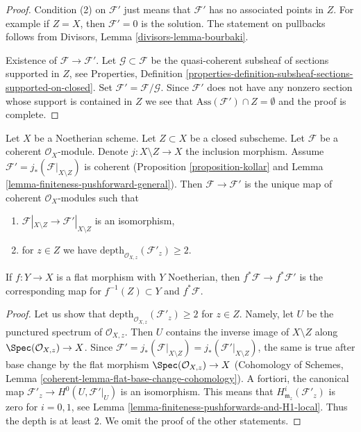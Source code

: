 \begin{proof}
Condition (2) on $\mathcal{F}'$ just means that $\mathcal{F}'$
has no associated points in $Z$. For example if
$Z = X$, then $\mathcal{F}' = 0$ is the solution.
The statement on pullbacks follows from
Divisors, Lemma \ref{divisors-lemma-bourbaki}.

\medskip\noindent
Existence of $\mathcal{F} \to \mathcal{F}'$.
Let $\mathcal{G} \subset \mathcal{F}$
be the quasi-coherent subsheaf of sections supported in $Z$, see
Properties, Definition
\ref{properties-definition-subsheaf-sections-supported-on-closed}.
Set $\mathcal{F}' = \mathcal{F}/\mathcal{G}$.
Since $\mathcal{F}'$ does not have any nonzero section
whose support is contained in $Z$ we see that
$\text{Ass}(\mathcal{F}') \cap Z = \emptyset$
and the proof is complete.
\end{proof}

\begin{lemma}
\label{lemma-get-depth-2-along-Z}
Let $X$ be a Noetherian scheme. Let $Z \subset X$ be a closed subscheme.
Let $\mathcal{F}$ be a coherent $\mathcal{O}_X$-module. Denote
$j : X \setminus Z \to X$ the inclusion morphism.
Assume $\mathcal{F}' = j_*(\mathcal{F}|_{X \setminus Z})$
is coherent (Proposition \ref{proposition-kollar} and
Lemma \ref{lemma-finiteness-pushforward-general}).
Then $\mathcal{F} \to \mathcal{F}'$ is the unique map
of coherent $\mathcal{O}_X$-modules such that
\begin{enumerate}
\item $\mathcal{F}|_{X \setminus Z} \to \mathcal{F}'|_{X \setminus Z}$
is an isomorphism,
\item for $z \in Z$ we have
$\text{depth}_{\mathcal{O}_{X, z}}(\mathcal{F}'_z) \geq 2$.
\end{enumerate}
If $f : Y \to X$ is a flat morphism with $Y$ Noetherian, then
$f^*\mathcal{F} \to f^*\mathcal{F}'$ is the corresponding
map for $f^{-1}(Z) \subset Y$ and $f^*\mathcal{F}$.
\end{lemma}

\begin{proof}
Let us show that $\text{depth}_{\mathcal{O}_{X, z}}(\mathcal{F}'_z) \geq 2$
for $z \in Z$. Namely, let $U$ be the punctured spectrum of
$\mathcal{O}_{X, z}$. Then $U$ contains the inverse image of
$X \setminus Z$ along $\Spec(\mathcal{O}_{X, z}) \to X$.
Since $\mathcal{F}' = j_*(\mathcal{F}|_{X \setminus Z}) =
j_*(\mathcal{F}'|_{X \setminus Z})$, the same is true after
base change by the flat morphism $\Spec(\mathcal{O}_{X, z}) \to X$
(Cohomology of Schemes, Lemma
\ref{coherent-lemma-flat-base-change-cohomology}).
A fortiori, the canonical map
$\mathcal{F}'_z \to H^0(U, \mathcal{F}'|_U)$
is an isomorphism. This means that $H^i_{\mathfrak m_z}(\mathcal{F}'_z)$
is zero for $i = 0, 1$, see
Lemma \ref{lemma-finiteness-pushforwards-and-H1-local}.
Thus the depth is at least $2$.
We omit the proof of the other statements.
\end{proof}

